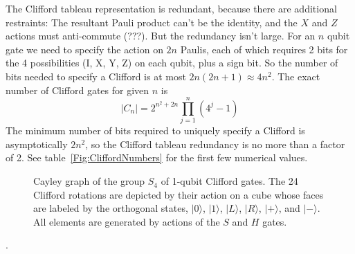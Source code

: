 The Clifford tableau representation is redundant, because there are additional restraints: The resultant Pauli product can't be the identity, and the $X$ and $Z$ actions must anti-commute (???). But the redundancy isn't large. For an $n$ qubit gate we need to specify the action on $2n$ Paulis, each of which requires 2 bits for the 4 possibilities (I, X, Y, Z) on each qubit, plus a sign bit. So the number of bits needed to specify a Clifford is at most $2n(2n+1)\approx 4n^2$. 
The exact number of Clifford gates for given $n$ is
\[
|C_n| = 2^{n^2+2n} \prod_{j=1}^{n} (4^j-1)
\]
The minimum number of bits required to uniquely specify a Clifford is asymptotically $2n^2$, so the Clifford tableau redundancy is no more than a factor of 2. See table~\ref{Fig:CliffordNumbers} for the first few numerical values.

%
%
%
%
%


\begin{figure}
\begin{center}
\end{center}
\caption[Cayley graph of the group $S_4$ of 1-qubit Clifford gates]{Cayley graph of the group $S_4$ of 1-qubit Clifford gates. The 24 Clifford rotations are depicted by their action on a cube whose faces are labeled by the orthogonal states, $|0\rangle$, $|1\rangle$, $|L\rangle$, $|R\rangle$, $|+\rangle$, and $|-\rangle$. All elements are generated by actions of the $S$ and $H$ gates.
\footnotemark
{}
}
\end{figure}
.

